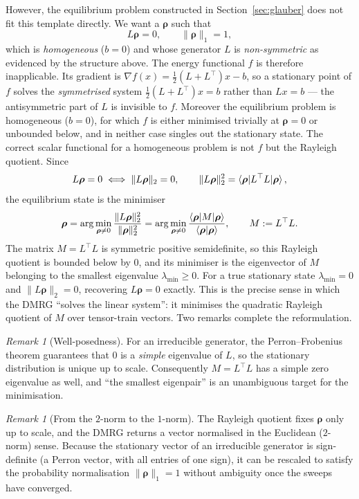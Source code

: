 \documentclass[12pt]{article}
\newcommand{\brho}{\boldsymbol{\rho}}
\theoremstyle{definition}
\theoremstyle{remark}
\newtheorem{remark}[theorem]{Remark}
\begin{document}
However, the equilibrium problem constructed in Section~\ref{sec:glauber} does not fit this template directly. We want a $\brho$ such that 
\[
L\brho = 0, \qquad \|\brho\|_1 = 1,
\]
which is \emph{homogeneous} ($b = 0$) and whose generator $L$ is \emph{non-symmetric} as evidenced by the structure above. The energy functional $f$ is therefore inapplicable. Its gradient is $\nabla f(x) = \tfrac{1}{2}(L + L^\top)x - b$, so a stationary point of $f$ solves the \emph{symmetrised} system $\tfrac{1}{2}(L + L^\top)x = b$ rather than $Lx = b$ --- the antisymmetric part of $L$ is invisible to $f$. Moreover the equilibrium problem is homogeneous ($b = 0$), for which $f$ is either minimised trivially at $\brho = 0$ or unbounded below, and in neither case singles out the stationary state. The correct scalar functional for a homogeneous problem is not $f$ but the Rayleigh quotient. Since
\[
L\brho = 0 \iff \|L\brho\|_2 = 0, \qquad \|L\brho\|_2^2 = \braket{\brho | L^\top L | \brho},
\]
the equilibrium state is the minimiser
\[
\brho = \arg\min_{\brho \neq 0} \frac{\|L\brho\|_2^2}{\|\brho\|_2^2}
      = \arg\min_{\brho \neq 0} \frac{\braket{\brho | M | \brho}}{\braket{\brho | \brho}},
      \qquad M := L^\top L.
\]
The matrix $M = L^\top L$ is symmetric positive semidefinite, so this Rayleigh quotient is bounded below by $0$, and its minimiser is the eigenvector of $M$ belonging to the smallest eigenvalue $\lambda_{\min} \geq 0$. For a true stationary state $\lambda_{\min} = 0$ and $\|L\brho\|_2 = 0$, recovering $L\brho = 0$ exactly. This is the precise sense in which the DMRG ``solves the linear system'': it minimises the quadratic Rayleigh quotient of $M$ over tensor-train vectors. Two remarks complete the reformulation.

\begin{remark}[Well-posedness]
For an irreducible generator, the Perron--Frobenius theorem guarantees that $0$ is a \emph{simple} eigenvalue of $L$, so the stationary distribution is unique up to scale. Consequently $M = L^\top L$ has a simple zero eigenvalue as well, and ``the smallest eigenpair'' is an unambiguous target for the minimisation.
\end{remark}

\begin{remark}[From the $2$-norm to the $1$-norm]\label{rem:normalisation}
The Rayleigh quotient fixes $\brho$ only up to scale, and the DMRG returns a vector normalised in the Euclidean ($2$-norm) sense. Because the stationary vector of an irreducible generator is sign-definite (a Perron vector, with all entries of one sign), it can be rescaled to satisfy the probability normalisation $\|\brho\|_1 = 1$ without ambiguity once the sweeps have converged.
\end{remark}
\end{document}
